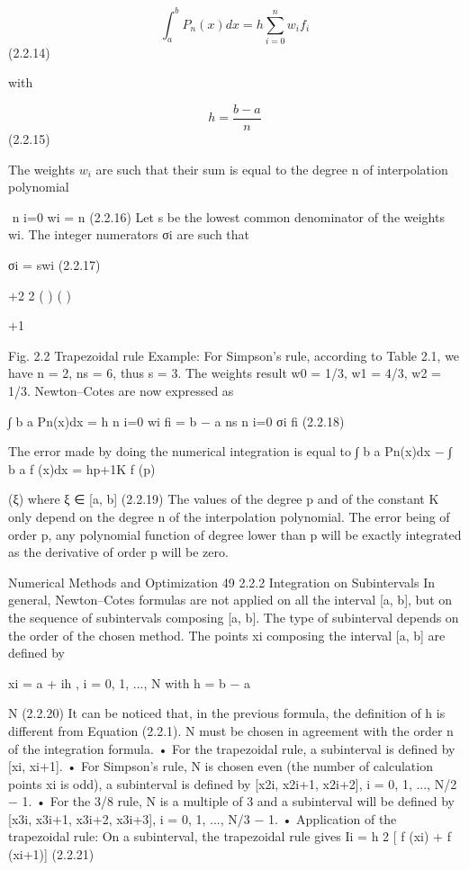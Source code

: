 \documentclass[letterpaper,12pt]{article}
\begin{document}
$$
\int^b_a P_n(x)dx = h \sum^n_{i=0} w_i f_i 
$$
(2.2.14)

with

$$
h = \frac{b - a}{n}
$$
 (2.2.15)

The weights $w_i$ are such that their sum is equal to the degree n of interpolation
polynomial

$$
n
i=0
wi = n (2.2.16)
Let s be the lowest common denominator of the weights wi. The integer numerators
σi are such that

σi = swi (2.2.17)

+2
2 ( )
( )

+1

Fig. 2.2 Trapezoidal rule
Example: For Simpson’s rule, according to Table 2.1, we have n = 2, ns = 6, thus
s = 3. The weights result w0 = 1/3, w1 = 4/3, w2 = 1/3.
Newton–Cotes are now expressed as

∫ b
a
Pn(x)dx = h
n
i=0
wi fi = b − a
ns
n
i=0
σi fi (2.2.18)

The error made by doing the numerical integration is equal to
∫ b
a
Pn(x)dx −
∫ b
a
f (x)dx = hp+1K f (p)

(ξ) where ξ ∈ [a, b] (2.2.19)
The values of the degree p and of the constant K only depend on the degree n of
the interpolation polynomial. The error being of order p, any polynomial function of
degree lower than p will be exactly integrated as the derivative of order p will be zero.

Numerical Methods and Optimization 49
2.2.2 Integration on Subintervals
In general, Newton–Cotes formulas are not applied on all the interval [a, b], but on
the sequence of subintervals composing [a, b]. The type of subinterval depends on the
order of the chosen method. The points xi composing the interval [a, b] are defined by

xi = a + ih , i = 0, 1, ..., N with h = b − a

N (2.2.20)
It can be noticed that, in the previous formula, the definition of h is different from
Equation (2.2.1). N must be chosen in agreement with the order n of the integration
formula.
• For the trapezoidal rule, a subinterval is defined by [xi, xi+1].
• For Simpson’s rule, N is chosen even (the number of calculation points xi is odd),
a subinterval is defined by [x2i, x2i+1, x2i+2], i = 0, 1, ..., N/2 − 1.
• For the 3/8 rule, N is a multiple of 3 and a subinterval will be defined by
[x3i, x3i+1, x3i+2, x3i+3], i = 0, 1, ..., N/3 − 1.
• Application of the trapezoidal rule:
On a subinterval, the trapezoidal rule gives
Ii = h
2
[ f (xi) + f (xi+1)] (2.2.21)
\end{document}
